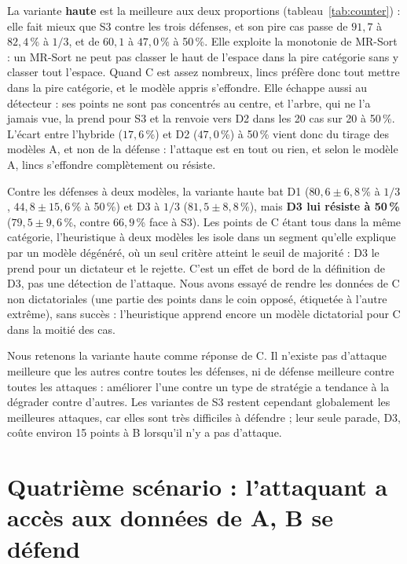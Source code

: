 \documentclass[11pt,a4paper]{article}
\begin{document}
La variante \textbf{haute} est la meilleure aux deux proportions (tableau~\ref{tab:counter}) : elle fait mieux que
S3 contre les trois défenses, et son pire cas passe de $91{,}7$ à $82{,}4$\,\% à $1/3$, et de $60{,}1$ à $47{,}0$\,\% à
50\,\%. Elle exploite la monotonie de MR-Sort : un MR-Sort ne peut pas classer le haut de l'espace dans la pire
catégorie sans y classer tout l'espace. Quand C est assez nombreux, lincs préfère donc tout mettre dans la pire
catégorie, et le modèle appris s'effondre. Elle échappe aussi au détecteur : ses points ne sont pas concentrés au
centre, et l'arbre, qui ne l'a jamais vue, la prend pour S3 et la renvoie vers D2 dans les 20 cas sur 20 à
50\,\%. L'écart entre l'hybride ($17{,}6$\,\%) et D2 ($47{,}0$\,\%) à 50\,\% vient donc du tirage des modèles A, et
non de la défense : l'attaque est en tout ou rien, et selon le modèle A, lincs s'effondre complètement ou
résiste.

Contre les défenses à deux modèles, la variante haute bat D1 ($80{,}6 \pm 6{,}8$\,\% à $1/3$, $44{,}8 \pm 15{,}6$\,\% à
50\,\%) et D3 à $1/3$ ($81{,}5 \pm 8{,}8$\,\%), mais \textbf{D3 lui résiste à 50\,\%} ($79{,}5 \pm 9{,}6$\,\%, contre
$66{,}9$\,\% face à S3). Les points de C étant tous dans la même catégorie, l'heuristique à deux modèles les isole dans
un segment qu'elle explique par un modèle dégénéré, où un seul critère atteint le seuil de majorité : D3 le prend
pour un dictateur et le rejette. C'est un effet de bord de la définition de D3, pas une détection de l'attaque.
Nous avons essayé de rendre les données de C non dictatoriales (une partie des points dans le coin opposé,
étiquetée à l'autre extrême), sans succès : l'heuristique apprend encore un modèle dictatorial pour C dans la
moitié des cas.

Nous retenons la variante haute comme réponse de C. Il n'existe pas d'attaque meilleure que les autres contre
toutes les défenses, ni de défense meilleure contre toutes les attaques : améliorer l'une contre un type de
stratégie a tendance à la dégrader contre d'autres. Les variantes de S3 restent cependant globalement les
meilleures attaques, car elles sont très difficiles à défendre ; leur seule parade, D3, coûte environ 15 points
à B lorsqu'il n'y a pas d'attaque.

\section{Quatrième scénario : l'attaquant a accès aux données de A, B se défend}
\end{document}

